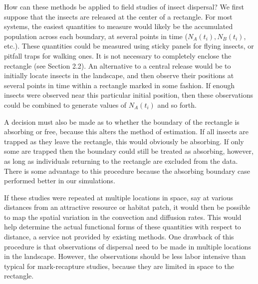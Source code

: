 \documentclass[11pt]{article}
\begin{document}
How can these methods be applied to field studies of insect dispersal?  We first suppose that the insects are released at the center of a rectangle.  For most systems, the easiest quantities to measure would likely be the accumulated population across each boundary, at several points in time ($N_A(t_i), N_B(t_i)$, etc.).  These quantities could be measured using sticky panels for flying insects, or pitfall traps for walking ones.  It is not necessary to completely enclose the rectangle (see Section 2.2).  An alternative to a central release would be to initially locate insects in the landscape, and then observe their positions at several points in time within a rectangle marked in some fashion.  If enough insects were observed near this particular initial position, then these observations could be combined to generate values of $N_A(t_i)$ and so forth.  

A decision must also be made as to whether the boundary of the rectangle is absorbing or free, because this alters the method of estimation.  If all insects are trapped as they leave the rectangle, this would obviously be absorbing.  If only some are trapped then the boundary could still be treated as absorbing, however, as long as individuals returning to the rectangle are excluded from the data.  There is some advantage to this procedure because the absorbing boundary case performed better in our simulations.  

If these studies were repeated at multiple locations in space, say at various distances from an attractive resource or habitat patch, it would then be possible to map the spatial variation in the convection and diffusion rates.  This would help determine the actual functional forms of these quantities with respect to distance, a service not provided by existing methods.  One drawback of this procedure is that observations of dispersal need to be made in multiple locations in the landscape.  However, the observations should be less labor intensive than typical for mark-recapture studies, because they are limited in space to the rectangle.  
\end{document}
